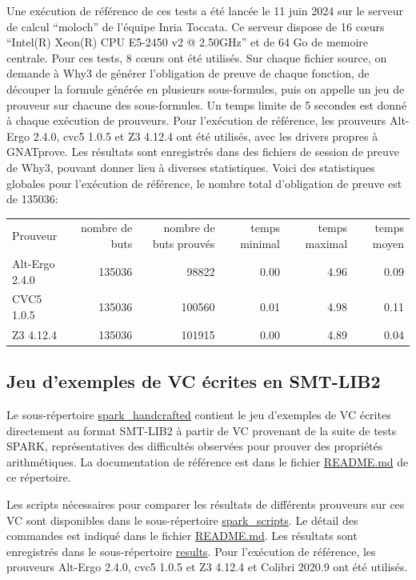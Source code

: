 \documentclass[a4paper,11pt]{article}
\begin{document}
Une exécution de référence de ces tests a été lancée le 11 juin 2024
sur le serveur de calcul ``moloch'' de l'équipe Inria Toccata. Ce
serveur dispose de 16 c{\oe}urs ``Intel(R) Xeon(R) CPU E5-2450 v2 @
2.50GHz'' et de 64 Go de memoire centrale. Pour ces tests, 8 c{\oe}urs
ont été utilisés. Sur chaque fichier source, on demande à Why3 de
générer l'obligation de preuve de chaque fonction, de découper la
formule générée en plusieurs sous-formules, puis on appelle un jeu de
prouveur sur chacune des sous-formules. Un temps limite de 5 secondes est donné à chaque exécution de prouveurs. Pour l'exécution de référence,
les prouveurs Alt-Ergo 2.4.0, cvc5 1.0.5 et Z3 4.12.4 ont
été utilisés, avec les drivers propres à GNATprove.
Les résultats sont enregistrés dans des fichiers de
session de preuve de Why3, pouvant donner lieu à diverses
statistiques. Voici des statistiques globales pour l'exécution de
référence, le nombre total d'obligation de preuve est de 135036:
\begin{center}
  \begin{tabular}{|l|r|r|r|r|r|}
  \rowcolor{gray!50} Prouveur
  & \multicolumn{1}{p{0.13\textwidth}|}{nombre de buts}
  & \multicolumn{1}{p{0.13\textwidth}|}{nombre de buts prouvés}
  & \multicolumn{1}{p{0.13\textwidth}|}{temps minimal}
  & \multicolumn{1}{p{0.13\textwidth}|}{temps maximal}
  & \multicolumn{1}{p{0.13\textwidth}|}{temps moyen}
  \\
  Alt-Ergo 2.4.0                & 135036 &  98822 &  0.00  & 4.96 &  0.09 \\
  CVC5 1.0.5                    & 135036 & 100560 &  0.01  & 4.98 &  0.11 \\
  Z3 4.12.4                     & 135036 & 101915 &  0.00  & 4.89 &  0.04
\end{tabular}
\end{center}

\subsection{Jeu d'exemples de VC écrites en SMT-LIB2}

Le sous-répertoire \url{spark_handcrafted} contient le jeu d'exemples de VC
écrites directement au format SMT-LIB2 à partir de VC provenant de la suite de
tests SPARK, représentatives des difficultés observées pour prouver des
propriétés arithmétiques. La documentation de référence est dans le fichier
\url{README.md} de ce répertoire.

Les scripts nécessaires pour comparer les résultats de différents prouveurs sur
ces VC sont disponibles dans le sous-répertoire \url{spark_scripts}. Le détail
des commandes est indiqué dans le fichier \url{README.md}. Les résultats sont
enregistrés dans le sous-répertoire \url{results}.  Pour l'exécution de
référence, les prouveurs Alt-Ergo 2.4.0, cvc5 1.0.5 et Z3 4.12.4 et Colibri
2020.9 ont été utilisés.
\end{document}

